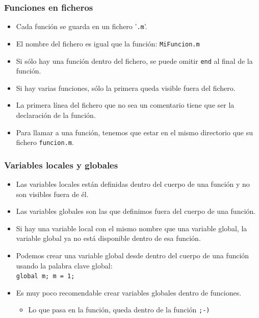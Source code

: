 \begin{frame}[label=func_ficheros]
 \frametitle{Funciones en ficheros}
 \begin{itemize}
  \item Cada función se guarda en un fichero '\texttt{.m}'.
  \item El nombre del fichero es igual que la función: \texttt{MiFuncion.m}
  \item Si sólo hay una función dentro del fichero, se puede omitir
    \alert{\texttt{end}} al final de la función.
  \item Si hay varias funciones, sólo la primera queda visible fuera del
    fichero.
  \item La primera línea del fichero que no sea un comentario tiene que ser la
    declaración de la función.
  \item Para llamar a una función, tenemos que estar en el mismo directorio que
    su fichero \texttt{funcion.m}.
 \end{itemize}
\end{frame}
\begin{frame}[label=func_variables,shrink=1]
 \frametitle{Variables locales y globales}
 \begin{itemize}
  \item Las variables \alert{locales} están definidas dentro del cuerpo de una
    función y no son visibles fuera de él.
  \item Las variables \alert{globales} son las que definimos fuera del cuerpo de
    una función.
  \item Si hay una variable local con el mismo nombre que una variable global,
    la variable global ya no está disponible dentro de esa función.
  \item Podemos crear una variable global desde dentro del cuerpo de una función
    usando la palabra clave global: \\\hspace{15mm}\texttt{global m; m = 1;}
  \item Es muy \alert{poco recomendable} crear variables globales dentro de
    funciones.
  \begin{itemize}
    \item Lo que pasa en la función, queda dentro de la función \texttt{;-)}
  \end{itemize}
 \end{itemize}
\end{frame}

